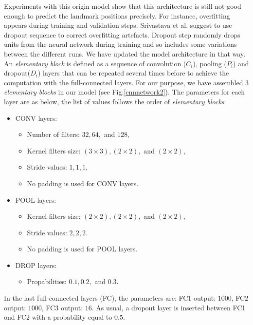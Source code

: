 \documentclass[10pt]{article}
\begin{document}
Experiments with this origin model show that this architecture is still
not good enough to predict the landmark positions precisely. For
instance, overfitting appears during training and validation
steps. Srivastava et al. \cite{srivastava2014dropout} suggest to use
dropout sequence to correct overfitting artefacts. Dropout step randomly drops units from the
neural network during training and so includes some variations between
the different runs. We have updated the model architecture in that
way. An \textit{elementary block} is defined as a sequence of
convolution (\textit{$C_i$}), pooling (\textit{$P_i$}) and dropout(\textit{$D_i$}) layers that can be repeated several
times before to achieve the computation with the full-connected
layers. For our purpose, we have assembled $3$ \textit{elementary
  blocks} in our model (see Fig.\ref{cnnnetwork2}). The parameters for
each layer are as below, the list of values follows the order of
\textit{elementary blocks}:

\begin{itemize}[nosep,label=\footnotesize$\bullet$]

\item CONV layers:
		\begin{itemize}[nosep]
			\item Number of filters: $32, 64,$ and $128$,
			\item Kernel filters size: $(3 \times 3), (2 \times 2),$ and $(2 \times 2)$,
			\item Stride values: $1, 1, 1$,
			\item No padding is used for CONV layers.
		\end{itemize}			
	\item POOL layers:
		\begin{itemize}[nosep]
			\item Kernel filters size: $(2 \times 2), (2 \times 2),$ and $(2 \times 2)$,
			\item Stride values: $2, 2, 2$.
			\item No padding is used for POOL layers.
		\end{itemize}
	\item DROP layers: 
		\begin{itemize}[nosep]
			\item Propabilities: $0.1, 0.2, $ and $0.3$.
		\end{itemize}
	\end{itemize}
In the last full-connected layers (FC), the parameters are: FC1 output:
$1000$, FC2 output: $1000$, FC3  output: $16$. As usual, a dropout layer is
inserted between FC1 ond FC2 with a probability equal to $0.5$.
\end{document}
